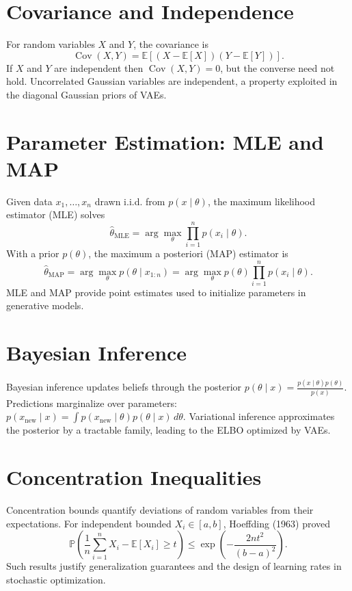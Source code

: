 \documentclass[11pt]{book}
\begin{document}
\section{Covariance and Independence}
For random variables $X$ and $Y$, the covariance is
\begin{equation}
\operatorname{Cov}(X,Y)=\mathbb{E}[(X-\mathbb{E}[X])(Y-\mathbb{E}[Y])].
\end{equation}
If $X$ and $Y$ are independent then $\operatorname{Cov}(X,Y)=0$, but the converse need not hold. Uncorrelated Gaussian variables are independent, a property exploited in the diagonal Gaussian priors of VAEs.

\section{Parameter Estimation: MLE and MAP}
Given data $x_1,\dots,x_n$ drawn i.i.d. from $p(x\mid\theta)$, the maximum likelihood estimator (MLE) solves
\begin{equation}
\hat{\theta}_{\mathrm{MLE}}=\arg\max_{\theta} \prod_{i=1}^n p(x_i\mid\theta).
\end{equation}
With a prior $p(\theta)$, the maximum a posteriori (MAP) estimator is
\begin{equation}
\hat{\theta}_{\mathrm{MAP}}=\arg\max_{\theta} p(\theta\mid x_{1:n})=\arg\max_{\theta} p(\theta)\prod_{i=1}^n p(x_i\mid\theta).
\end{equation}
MLE and MAP provide point estimates used to initialize parameters in generative models.

\section{Bayesian Inference}
Bayesian inference updates beliefs through the posterior $p(\theta\mid x)=\frac{p(x\mid\theta)p(\theta)}{p(x)}$. Predictions marginalize over parameters: $p(x_{\text{new}}\mid x)=\int p(x_{\text{new}}\mid\theta)p(\theta\mid x)\, d\theta$. Variational inference approximates the posterior by a tractable family, leading to the ELBO optimized by VAEs.

\section{Concentration Inequalities}
Concentration bounds quantify deviations of random variables from their expectations. For independent bounded $X_i\in[a,b]$, Hoeffding (1963) proved
\begin{equation}
\mathbb{P}\left(\frac1n\sum_{i=1}^n X_i-\mathbb{E}[X_i]\ge t\right)\le\exp\left(-\frac{2n t^2}{(b-a)^2}\right).
\end{equation}
Such results justify generalization guarantees and the design of learning rates in stochastic optimization.
\end{document}
